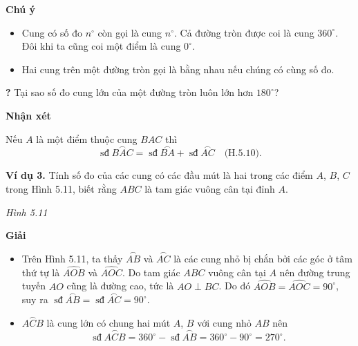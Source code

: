 \begin{lesson}
    \textbf{Chú ý}
    \begin{itemize}
        \item Cung có số đo $n^\circ$ còn gọi là cung $n^\circ$. Cả đường tròn được coi là cung $360^\circ$. Đôi khi ta cũng coi một điểm là cung $0^\circ$.
        \item Hai cung trên một đường tròn gọi là bằng nhau nếu chúng có cùng số đo.
    \end{itemize}

    \textbf{?} Tại sao số đo cung lớn của một đường tròn luôn lớn hơn $180^\circ$?

    \answerline

    \textbf{Nhận xét}

    Nếu $A$ là một điểm thuộc cung $BAC$ thì
    \[
        \operatorname{sđ}\overset{\frown}{BAC}
        =\operatorname{sđ}\overset{\frown}{BA}
        +\operatorname{sđ}\overset{\frown}{AC}
        \quad\text{(H.5.10)}.
    \]

    \textbf{Ví dụ 3.} Tính số đo của các cung có các đầu mút là hai trong các điểm $A$, $B$, $C$ trong Hình 5.11, biết rằng $ABC$ là tam giác vuông cân tại đỉnh $A$.

    \begin{center}

        \textit{Hình 5.11}
    \end{center}

    \textbf{Giải}

    \begin{itemize}
        \item Trên Hình 5.11, ta thấy $\overset{\frown}{AB}$ và $\overset{\frown}{AC}$ là các cung nhỏ bị chắn bởi các góc ở tâm thứ tự là $\widehat{AOB}$ và $\widehat{AOC}$. Do tam giác $ABC$ vuông cân tại $A$ nên đường trung tuyến $AO$ cũng là đường cao, tức là $AO\perp BC$. Do đó $\widehat{AOB}=\widehat{AOC}=90^\circ$, suy ra $\operatorname{sđ}\overset{\frown}{AB}=\operatorname{sđ}\overset{\frown}{AC}=90^\circ$.
        \item $\overset{\frown}{ACB}$ là cung lớn có chung hai mút $A$, $B$ với cung nhỏ $AB$ nên
        \[
            \operatorname{sđ}\overset{\frown}{ACB}
            =360^\circ-\operatorname{sđ}\overset{\frown}{AB}
            =360^\circ-90^\circ=270^\circ.
        \]
    \end{itemize}


\end{lesson}
